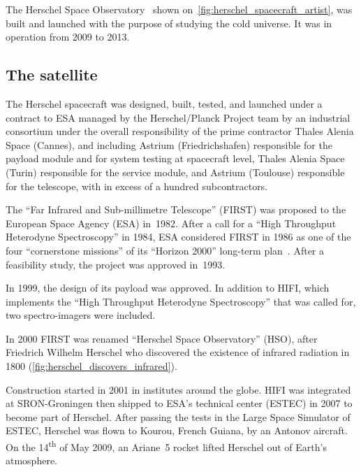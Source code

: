 The Herschel Space Observatory~\autocite{AA_518_L1}
shown on~\cref{fig:herschel_spacecraft_artist},
was built and launched with the purpose of studying the cold universe.
It was in operation from 2009 to 2013.


\subsection{The satellite}

The Herschel spacecraft was designed, built, tested, and launched under a contract to ESA managed by the Herschel/Planck Project team by an industrial consortium under the overall responsibility of the prime contractor Thales Alenia Space (Cannes), and including Astrium (Friedrichshafen) responsible for the payload module and for system testing at spacecraft level, Thales Alenia Space (Turin) responsible for the service module, and Astrium (Toulouse) responsible for the telescope, with in excess of a hundred subcontractors.

The ``Far Infrared and Sub-millimetre Telescope'' (FIRST) was proposed to the European Space Agency (ESA) in~1982.
After a call for a ``High Throughput Heterodyne Spectroscopy'' in 1984,
ESA considered FIRST in 1986 as one of the four ``cornerstone missions'' of its ``Horizon 2000'' long-term plan~\autocite{pilbratt1997first}.
After a feasibility study, the project was approved in~1993.

In 1999, the design of its payload was approved.
In addition to HIFI, which implements the ``High Throughput Heterodyne Spectroscopy'' that was called for, two spectro-imagers were included.

In 2000 FIRST was renamed ``Herschel Space Observatory'' (HSO), after Friedrich Wilhelm Herschel who discovered the existence of infrared radiation in 1800 (\cref{fig:herschel_discovers_infrared}).

Construction started in 2001 in institutes around the globe.
HIFI was integrated at SRON-Groningen then shipped to ESA's technical center (ESTEC) in 2007 to become part of Herschel.
After passing the tests in the Large Space Simulator of ESTEC, Herschel was flown to Kourou, French Guiana, by an Antonov aircraft.
On the 14\textsuperscript{th} of May 2009, an Ariane~5 rocket lifted Herschel out of Earth's atmosphere.

